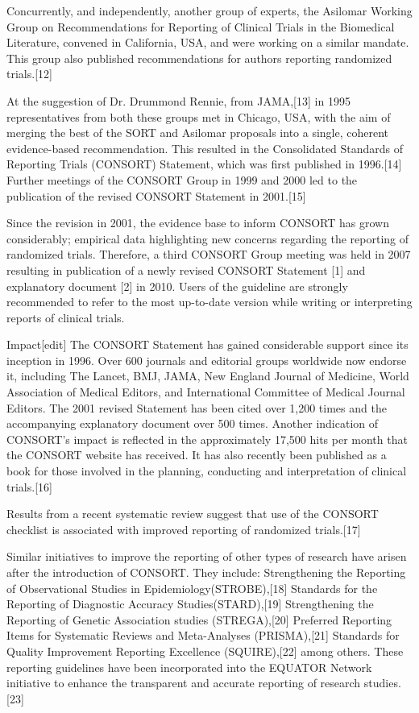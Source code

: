 Concurrently, and independently, another group of experts, the Asilomar Working Group on Recommendations for Reporting of Clinical Trials in the Biomedical Literature, convened in California, USA, and were working on a similar mandate. This group also published recommendations for authors reporting randomized trials.[12]

At the suggestion of Dr. Drummond Rennie, from JAMA,[13] in 1995 representatives from both these groups met in Chicago, USA, with the aim of merging the best of the SORT and Asilomar proposals into a single, coherent evidence-based recommendation. This resulted in the Consolidated Standards of Reporting Trials (CONSORT) Statement, which was first published in 1996.[14] Further meetings of the CONSORT Group in 1999 and 2000 led to the publication of the revised CONSORT Statement in 2001.[15]

Since the revision in 2001, the evidence base to inform CONSORT has grown considerably; empirical data highlighting new concerns regarding the reporting of randomized trials. Therefore, a third CONSORT Group meeting was held in 2007 resulting in publication of a newly revised CONSORT Statement [1] and explanatory document [2] in 2010. Users of the guideline are strongly recommended to refer to the most up-to-date version while writing or interpreting reports of clinical trials.

Impact[edit]
The CONSORT Statement has gained considerable support since its inception in 1996. Over 600 journals and editorial groups worldwide now endorse it, including The Lancet, BMJ, JAMA, New England Journal of Medicine, World Association of Medical Editors, and International Committee of Medical Journal Editors. The 2001 revised Statement has been cited over 1,200 times and the accompanying explanatory document over 500 times. Another indication of CONSORT’s impact is reflected in the approximately 17,500 hits per month that the CONSORT website has received. It has also recently been published as a book for those involved in the planning, conducting and interpretation of clinical trials.[16]

Results from a recent systematic review suggest that use of the CONSORT checklist is associated with improved reporting of randomized trials.[17]

Similar initiatives to improve the reporting of other types of research have arisen after the introduction of CONSORT. They include: Strengthening the Reporting of Observational Studies in Epidemiology(STROBE),[18] Standards for the Reporting of Diagnostic Accuracy Studies(STARD),[19] Strengthening the Reporting of Genetic Association studies (STREGA),[20] Preferred Reporting Items for Systematic Reviews and Meta-Analyses (PRISMA),[21] Standards for Quality Improvement Reporting Excellence (SQUIRE),[22] among others. These reporting guidelines have been incorporated into the EQUATOR Network initiative to enhance the transparent and accurate reporting of research studies.[23]
